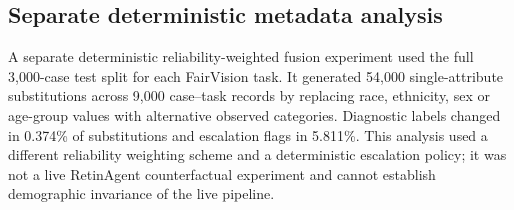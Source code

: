 \subsection*{Separate deterministic metadata analysis}
A separate deterministic reliability-weighted fusion experiment used the
full 3,000-case test split for each FairVision task. It generated 54,000
single-attribute substitutions across 9,000 case--task records by replacing
race, ethnicity, sex or age-group values with alternative observed categories.
Diagnostic labels changed in 0.374\% of substitutions and escalation flags
in 5.811\%. This analysis used a different reliability weighting scheme
and a deterministic escalation policy; it was not a live RetinAgent
counterfactual experiment and cannot establish demographic invariance of
the live pipeline.
